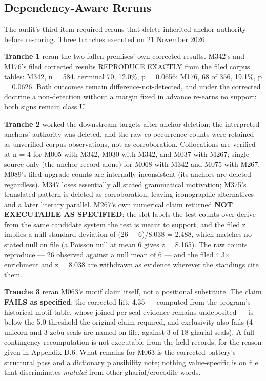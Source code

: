 \documentclass[11pt]{article}
\begin{document}
\subsection{Dependency-Aware Reruns}\label{appendix-d7-reruns}

The audit's third item required reruns that delete inherited
anchor authority before rescoring. Three tranches executed on 21
November 2026.

\textbf{Tranche 1} reran the two fallen premises' own corrected
results. M342's and M176's filed corrected results REPRODUCE
EXACTLY from the filed corpus tables: M342, n = 584, terminal
70, 12.0\%, p = 0.0656; M176, 68 of 356, 19.1\%, p = 0.0626.
Both outcomes remain difference-not-detected, and under the
corrected doctrine a non-detection without a margin fixed in
advance re-earns no support: both signs remain class U.

\textbf{Tranche 2} worked the downstream targets after anchor
deletion: the interpreted anchors' authority was deleted, and
the raw co-occurrence counts were retained as unverified corpus
observations, not as corroboration. Collocations are verified at
n = 4 for M005 with M342, M030 with M342, and M037 with M267;
single-source only (the anchor record alone) for M068 with M342
and M075 with M267. M089's filed upgrade counts are internally
inconsistent (its anchors are deleted regardless). M347 loses
essentially all stated grammatical motivation; M375's translated
pattern is deleted as corroboration, leaving iconographic
alternatives and a later literary parallel. M267's own numerical
claim returned \textbf{NOT EXECUTABLE AS SPECIFIED}: the slot
labels the test counts over derive from the same candidate
system the test is meant to support, and the filed z implies a
null standard deviation of (26 $-$ 6)/8.038 = 2.488, which
matches no stated null on file (a Poisson null at mean 6 gives
z = 8.165). The raw counts reproduce --- 26 observed against a
null mean of 6 --- and the filed 4.3$\times$ enrichment and
z = 8.038 are withdrawn as evidence wherever the standings cite
them.

\textbf{Tranche 3} reran M063's motif claim itself, not a
positional substitute. The claim \textbf{FAILS as specified}:
the corrected lift, 4.35 --- computed from the program's
historical motif table, whose joined per-seal evidence remains
undeposited --- is below the 5.0 threshold the original claim
required, and exclusivity also fails (4 unicorn and 3 zebu seals
are named on file, against 3 of 18 gharial seals). A full
contingency recomputation is not executable from the held
records, for the reason given in Appendix D.6. What
remains for M063 is the corrected battery's structural pass and
a dictionary plausibility note; nothing value-specific is on
file that discriminates \emph{mutalai} from other
gharial/crocodile words.
\end{document}
